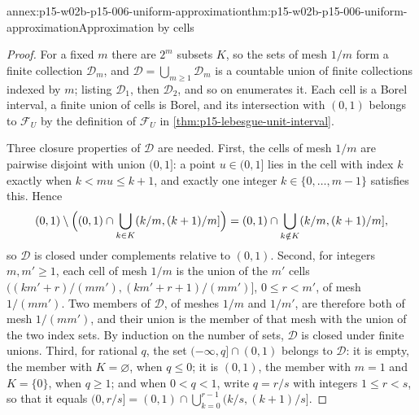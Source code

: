 \begin{annexitem}{annex:p15-w02b-p15-006-uniform-approximation}{thm:p15-w02b-p15-006-uniform-approximation}{Approximation by cells}
\begin{proof}
For a fixed \(m\) there are \(2^m\) subsets \(K\), so the sets of mesh
\(1/m\) form a finite collection \(\mathcal D_m\), and
\(\mathcal D=\bigcup_{m\geq1}\mathcal D_m\) is a countable union of
finite collections indexed by \(m\); listing \(\mathcal D_1\), then
\(\mathcal D_2\), and so on enumerates it. Each cell is a Borel
interval, a finite union of cells is Borel, and its intersection with
\((0,1)\) belongs to \(\mathcal F_U\) by the definition of
\(\mathcal F_U\) in \cref{thm:p15-lebesgue-unit-interval}.

Three closure properties of \(\mathcal D\) are needed. First, the cells
of mesh \(1/m\) are pairwise disjoint with union \((0,1]\): a point
\(u\in(0,1]\) lies in the cell with index \(k\) exactly when
\(k<mu\leq k+1\), and exactly one integer \(k\in\{0,\ldots,m-1\}\)
satisfies this. Hence
\[
 (0,1)\setminus\Bigl((0,1)\cap\bigcup_{k\in K}(k/m,(k+1)/m]\Bigr)
   =(0,1)\cap\bigcup_{k\notin K}(k/m,(k+1)/m],
\]
so \(\mathcal D\) is closed under complements relative to \((0,1)\).
Second, for integers \(m,m'\geq1\), each cell of mesh \(1/m\) is the
union of the \(m'\) cells
\(((km'+r)/(mm'),(km'+r+1)/(mm')]\), \(0\leq r<m'\), of mesh
\(1/(mm')\). Two members of \(\mathcal D\), of meshes \(1/m\) and
\(1/m'\), are therefore both of mesh \(1/(mm')\), and their union is the
member of that mesh with the union of the two index sets. By induction
on the number of sets, \(\mathcal D\) is closed under finite unions.
Third, for rational \(q\), the set \((-\infty,q]\cap(0,1)\) belongs to
\(\mathcal D\): it is empty, the member with \(K=\varnothing\), when
\(q\leq0\); it is \((0,1)\), the member with \(m=1\) and \(K=\{0\}\),
when \(q\geq1\); and when \(0<q<1\), write \(q=r/s\) with integers
\(1\leq r<s\), so that it equals
\((0,r/s]=(0,1)\cap\bigcup_{k=0}^{r-1}(k/s,(k+1)/s]\).


\end{proof}
\end{annexitem}
